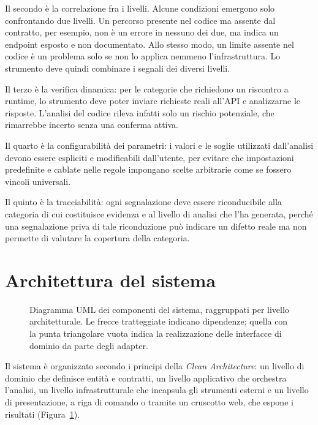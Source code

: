 Il secondo è la correlazione fra i livelli. Alcune condizioni emergono
solo confrontando due livelli. Un percorso presente nel codice ma assente
dal contratto, per esempio, non è un errore in nessuno dei due, ma indica
un endpoint esposto e non documentato. Allo stesso modo, un limite assente
nel codice è un problema solo se non lo applica nemmeno l'infrastruttura.
Lo strumento deve quindi combinare i segnali dei diversi livelli.

Il terzo è la verifica dinamica: per le categorie che richiedono
un riscontro a runtime, lo strumento deve poter inviare richieste reali
all'API e analizzarne le risposte. L'analisi del codice rileva infatti solo
un rischio potenziale, che rimarrebbe incerto senza una conferma attiva.

Il quarto è la configurabilità dei parametri: i valori e le
soglie utilizzati dall'analisi devono essere espliciti e modificabili
dall'utente, per evitare che impostazioni predefinite e cablate nelle
regole impongano scelte arbitrarie come se fossero vincoli universali.

Il quinto è la tracciabilità: ogni segnalazione deve essere
riconducibile alla categoria di cui costituisce evidenza e al livello di
analisi che l'ha generata, perché una segnalazione priva di tale riconduzione
può indicare un difetto reale ma non permette di valutare la copertura della
categoria.

\section{Architettura del sistema}
\label{sec:architettura}

\begin{figure}[!htbp]
  \centering
  
  \caption[Diagramma dei componenti del sistema]{Diagramma UML dei componenti
    del sistema, raggruppati per livello architetturale. Le frecce tratteggiate
    indicano dipendenze; quella con la punta triangolare vuota indica la
  realizzazione delle interfacce di dominio da parte degli adapter.}
  \label{fig:uml-componenti}
\end{figure}

Il sistema è organizzato secondo i principi della \emph{Clean Architecture}:
un livello di dominio che definisce entità e contratti, un livello
applicativo che orchestra l'analisi, un livello infrastrutturale che
incapsula gli strumenti esterni e un livello di presentazione, a riga di
comando o tramite un cruscotto web, che espone i risultati
(Figura~\ref{fig:uml-componenti}).


